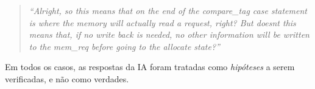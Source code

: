 \documentclass[12pt]{article}
\begin{document}
\begin{quote}
\emph{``Alright, so this means that on the end of the compare\_tag
case statement is where the memory will actually read a request,
right? But doesnt this means that, if no write back is needed, no
other information will be written to the mem\_req before going to
the allocate state?''}
\end{quote}

Em todos os casos, as respostas da IA foram tratadas como
\emph{hipóteses} a serem verificadas, e não como verdades.

\nocite{*}


\end{document}
